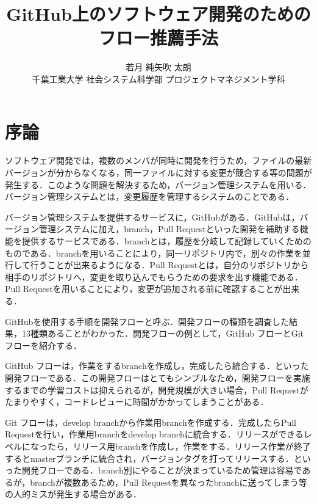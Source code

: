 \documentclass[uplatex,twocolumn]{jsarticle}
\title{\vspace{-10mm}GitHub上のソフトウェア開発のためのフロー推薦手法\footnotemark[0]}
\author{\large{若月 純\footnotemark[2]\qquad 矢吹 太朗}\\千葉工業大学 社会システム科学部 プロジェクトマネジメント学科\footnotemark[3]}
\date{}
\begin{document}
\twocolumn[\maketitle]

\begingroup
\def\thefootnote{\fnsymbol{footnote}}
\endgroup

\section{序論}

ソフトウェア開発では，複数のメンバが同時に開発を行うため，ファイルの最新バージョンが分からなくなる，同一ファイルに対する変更が競合する等の問題が発生する．このような問題を解決するため，バージョン管理システムを用いる．バージョン管理システムとは，変更履歴を管理するシステムのことである\cite{ikeda2014}．

バージョン管理システムを提供するサービスに，GitHubがある．GitHubは，バージョン管理システムに加え，branch，Pull Requestといった開発を補助する機能を提供するサービスである．branchとは，履歴を分岐して記録していくためのものである．branchを用いることにより，同一リポジトリ内で，別々の作業を並行して行うことが出来るようになる．Pull Requestとは，自分のリポジトリから相手のリポジトリへ，変更を取り込んでもらうための要求を出す機能である．Pull Requestを用いることにより，変更が追加される前に確認することが出来る．

GitHubを使用する手順を開発フローと呼ぶ．開発フローの種類を調査した結果，13種類あることがわかった．開発フローの例として，GitHub フローとGit フローを紹介する．

GitHub フローは，作業をするbranchを作成し，完成したら統合する．といった開発フローである．この開発フローはとてもシンプルなため，開発フローを実施するまでの学習コストは抑えられるが，開発規模が大きい場合，Pull Requestがたまりやすく，コードレビューに時間がかかってしまうことがある．

Git フローは，develop branchから作業用branchを作成する．完成したらPull Requestを行い，作業用branchをdevelop branchに統合する．リリースができるレベルになったら，リリース用branchを作成し，作業をする．リリース作業が終了するとmasterブランチに統合され，バージョンタグを打ってリリースする．といった開発フローである．branch別にやることが決まっているため管理は容易であるが，branchが複数あるため，Pull Requestを異なったbranchに送ってしまう等の人的ミスが発生する場合がある\cite{ohtsuka2014}．
\end{document}
